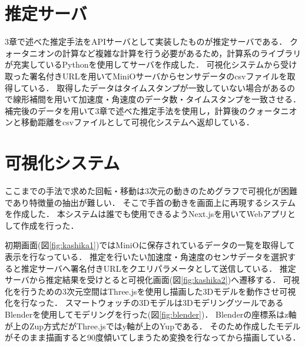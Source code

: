 \section{推定サーバ}
3章で述べた推定手法をAPIサーバとして実装したものが推定サーバである．
クォータニオンの計算など複雑な計算を行う必要があるため，計算系のライブラリが充実しているPythonを使用してサーバを作成した．
可視化システムから受け取った署名付きURLを用いてMiniOサーバからセンサデータのcsvファイルを取得している．
取得したデータはタイムスタンプが一致していない場合があるので線形補間を用いて加速度・角速度のデータ数・タイムスタンプを一致させる．
補完後のデータを用いて3章で述べた推定手法を使用し，計算後のクォータニオンと移動距離をcsvファイルとして可視化システムへ返却している．

\section{可視化システム}
ここまでの手法で求めた回転・移動は3次元の動きのためグラフで可視化が困難であり特徴量の抽出が難しい．
そこで手首の動きを画面上に再現するシステムを作成した．
本システムは誰でも使用できるようNext.jsを用いてWebアプリとして作成を行った．

初期画面(図\ref{fig:kashika1})ではMiniOに保存されているデータの一覧を取得して表示を行なっている．
推定を行いたい加速度・角速度のセンサデータを選択すると推定サーバへ署名付きURLをクエリパラメータとして送信している．
推定サーバから推定結果を受けとると可視化画面(図\ref{fig:kashika2})へ遷移する．
可視化を行うための3次元空間はThree.jsを使用し描画した3Dモデルを動作させ可視化を行なった．
スマートウォッチの3Dモデルは3DモデリングツールであるBlenderを使用してモデリングを行った(図\ref{fig:blender})．
Blenderの座標系はz軸が上のZup方式だがThree.jsではy軸が上のYupである．
そのため作成したモデルがそのまま描画すると90度傾いてしまうため変換を行なってから描画している．

